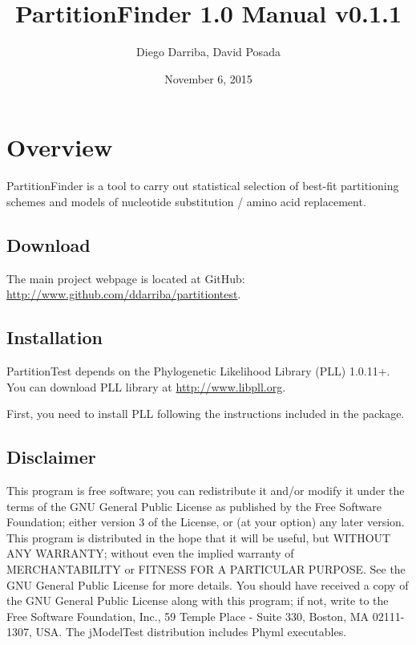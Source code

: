 \documentclass[11pt,twoside,a4paper]{article}
\begin{document}
\providecommand{\versionnumber}{0.1.1}
\title{PartitionFinder 1.0 Manual v\versionnumber}
\author{Diego Darriba, David Posada}
\date{November 6, 2015}
\maketitle

\setcounter{tocdepth}{2}
\tableofcontents

\section{Overview}

PartitionFinder is a tool to carry out statistical selection of best-fit partitioning schemes and models of nucleotide substitution / amino acid replacement.

\subsection{Download}

The main project webpage is located at GitHub: \url{http://www.github.com/ddarriba/partitiontest}.

\subsection{Installation}

PartitionTest depends on the Phylogenetic Likelihood Library (PLL) 1.0.11+.
You can download PLL library at \url{http://www.libpll.org}.

First, you need to install PLL following the instructions included in the package.



\subsection{Disclaimer}

This program is free software; you can redistribute it and/or modify it under the terms of the GNU General Public License as published by the Free Software Foundation; either version 3 of the License, or (at your option) any later version. This program is distributed in the hope that it will be useful, but WITHOUT ANY WARRANTY; without even the implied warranty of MERCHANTABILITY or FITNESS FOR A PARTICULAR PURPOSE. See the GNU General Public License for more details. You should have received a copy of the GNU General Public License along with this program; if not, write to the Free Software Foundation, Inc., 59 Temple Place - Suite 330, Boston, MA 02111-1307, USA. The jModelTest distribution includes Phyml executables.
\end{document}
